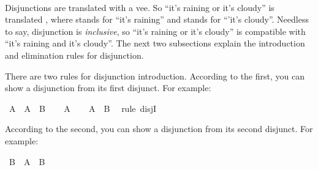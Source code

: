 \begin{isabellebody}
\isadelimproof
\ %
\endisadelimproof
%
\isatagproof
{}\isamarkupfalse%
%
\endisatagproof
{\isafoldproof}%
%
\isadelimproof
%
\endisadelimproof
%
\isadelimdocument
%
\endisadelimdocument
%
\isatagdocument
%
\isamarkuptrue%
%
\endisatagdocument
{\isafolddocument}%
%
\isadelimdocument
%
\endisadelimdocument
%
\begin{isamarkuptext}%
Disjunctions are translated with a vee. So ``it's raining or it's cloudy'' is translated
, where  stands for ``it's raining'' and  stands for ``'it's cloudy''.
Needless to say, disjunction is \emph{inclusive}, so ``it's raining or it's cloudy'' is compatible with
``it's raining and it's cloudy''. The next two subsections explain the introduction and elimination
rules for disjunction.%
\end{isamarkuptext}\isamarkuptrue%
%
\isadelimdocument
%
\endisadelimdocument
%
\isatagdocument
%
\isamarkuptrue%
%
\endisatagdocument
{\isafolddocument}%
%
\isadelimdocument
%
\endisadelimdocument
%
\begin{isamarkuptext}%
There are two rules for disjunction introduction. According to the first, you can show a 
disjunction from its first disjunct. For example:%
\end{isamarkuptext}\isamarkuptrue%
\isamarkupfalse%
\ {\isachardoublequoteopen}A\ {\isasymlongrightarrow}\ A\ {\isasymor}\ B{\isachardoublequoteclose}\isanewline
%
\isadelimproof
%
\endisadelimproof
%
\isatagproof
{}\isamarkupfalse%
\isanewline
\ \ \isamarkupfalse%
\ {\isachardoublequoteopen}A{\isachardoublequoteclose}\isanewline
\ \ \isamarkupfalse%
\ {\isachardoublequoteopen}A\ {\isasymor}\ B{\isachardoublequoteclose}\ \isamarkupfalse%
\ {\isacharparenleft}rule\ disjI{}{\isacharparenright}\isanewline
{}\isamarkupfalse%
%
\endisatagproof
{\isafoldproof}%
%
\isadelimproof
%
\endisadelimproof
%
\begin{isamarkuptext}%
According to the second, you can show a disjunction from its second disjunct. For example:%
\end{isamarkuptext}\isamarkuptrue%
\isamarkupfalse%
\ {\isachardoublequoteopen}B\ {\isasymlongrightarrow}\ A\ {\isasymor}\ B{\isachardoublequoteclose}\isanewline
%
\isadelimproof
%
\endisadelimproof
%
\isatagproof
{}\isamarkupfalse%
\isanewline
\ \ \isamarkupfalse%

\end{isabellebody}
